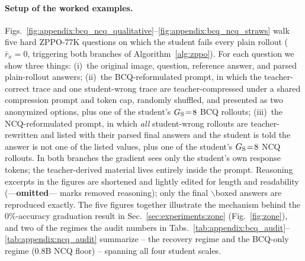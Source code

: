 \documentclass{llmxive}
\begin{document}
\paragraph{Setup of the worked examples.}
Figs.~\ref{fig:appendix:bcq_ncq_qualitative}--\ref{fig:appendix:bcq_ncq_straws} walk five hard ZPPO-$77$K questions on which the student fails every plain rollout ($\bar{r}_x\!=\!0$, triggering both branches of Algorithm~\ref{alg:zppo}). For each question we show three things: (i)~the original image, question, reference answer, and parsed plain-rollout answers; (ii)~the BCQ-reformulated prompt, in which the teacher-correct trace and one student-wrong trace are teacher-compressed under a shared compression prompt and token cap, randomly shuffled, and presented as two anonymized options, plus one of the student's $G_{\rm S}\!=\!8$ BCQ rollouts; (iii)~the NCQ-reformulated prompt, in which \emph{all} student-wrong rollouts are teacher-rewritten and listed with their parsed final answers and the student is told the answer is not one of the listed values, plus one of the student's $G_{\rm S}\!=\!8$ NCQ rollouts. In both branches the gradient sees only the student's own response tokens; the teacher-derived material lives entirely inside the prompt. Reasoning excerpts in the figures are shortened and lightly edited for length and readability (---\textbf{omitted}--- marks removed reasoning); only the final $\backslash$boxed answers are reproduced exactly. The five figures together illustrate the mechanism behind the $0\%$-accuracy graduation result in Sec.~\ref{sec:experiments:zone} (Fig.~\ref{fig:zone}), and two of the regimes the audit numbers in Tabs.~\ref{tab:appendix:bcq_audit}--\ref{tab:appendix:ncq_audit} summarize -- the recovery regime and the BCQ-only regime ($0.8$B NCQ floor) -- spanning all four student scales.
\end{document}
